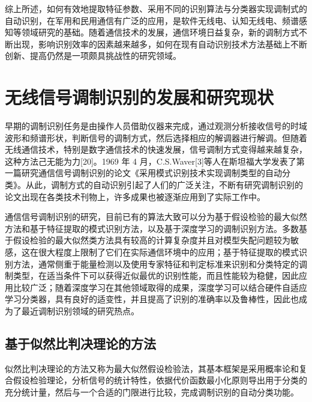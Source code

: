 综上所述，如何有效地提取特征参数、采用不同的识别算法与分类器实现调制式的自动识别，在军用和民用通信有广泛的应用，是软件无线电、认知无线电、频谱感知等领域研究的基础。随着通信技术的发展，通信环境日益复杂，新的调制方式不断出现，影响识别效率的因素越来越多，如何在现有自动识别技术方法基础上不断创新、提高仍然是一项颇具挑战性的研究领域。\par


\section{无线信号调制识别的发展和研究现状}

早期的调制识别任务是由操作人员借助仪器来完成，通过观测分析接收信号的时域波形和频谱形状，判断信号的调制方式，然后选择相应的解调器进行解调。但随着无线通信技术，特别是数字通信技术的快速发展，信号调制方式变得越来越复杂，这种方法己无能为力[20]。1969 年 4 月，C.S.Waver[3]等人在斯坦福大学发表了第一篇研究通信信号调制识别的论文《采用模式识别技术实现调制类型的自动分类》。从此，调制方式的自动识别引起了人们的广泛关注，不断有研究调制识别的论文出现在各类技术刊物上，许多成果也被逐渐应用到了实际工作中。 \par

通信信号调制识别的研究，目前已有的算法大致可以分为基于假设检验的最大似然方法和基于特征提取的模式识别方法，以及基于深度学习的调制识别方法。多数基于假设检验的最大似然类方法具有较高的计算复杂度并且对模型失配问题较为敏感，这在很大程度上限制了它们在实际通信环境中的应用；基于特征提取的模式识别方法，通常侧重于能量检测以及使用专家特征和判定标准来识别和分类特定的调制类型，在适当条件下可以获得近似最优的识别性能，而且性能较为稳健，因此应用比较广泛；随着深度学习在其他领域取得的成果，深度学习可以结合硬件自适应学习分类器，具有良好的适变性，并且提高了识别的准确率以及鲁棒性，因此也成为了最近调制识别领域的研究热点。\par

\subsection{基于似然比判决理论的方法}

似然比判决理论的方法又称为最大似然假设检验法，其基本框架是采用概率论和复合假设检验理论，分析信号的统计特性，依据代价函数最小化原则导出用于分类的充分统计量，然后与一个合适的门限进行比较，完成调制识别的自动分类功能。\par

